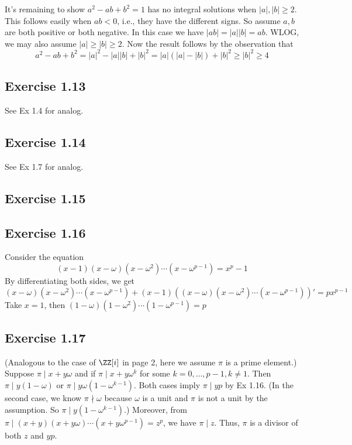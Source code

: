 \documentclass[../Chapter.tex]{subfiles}
\begin{document}
It's remaining to show $a^2-ab+b^2=1$ has no integral solutions when $|a|,|b|\geq 2$. This follows easily when $ab<0$, i.e., they have the different signs. So assume $a,b$ are both positive or both negative. In this case we have $|ab|=|a||b|=ab$. WLOG, we may also assume $|a|\geq |b|\geq 2$. Now the result follows by the observation that $$a^2-ab+b^2=|a|^2-|a||b|+|b|^2=|a|(|a|-|b|)+|b|^2\geq |b|^2\geq 4$$

\subsection*{Exercise 1.13}

See Ex 1.4 for analog.

\subsection*{Exercise 1.14}

See Ex 1.7 for analog.

\subsection*{Exercise 1.15}

\subsection*{Exercise 1.16}

Consider the equation $$(x-1)(x-\omega)(x-\omega^2)\cdots(x-\omega^{p-1})=x^p-1$$ By differentiating both sides, we get $$(x-\omega)(x-\omega^2)\cdots(x-\omega^{p-1})+(x-1)\left ( (x-\omega)(x-\omega^2)\cdots(x-\omega^{p-1}) \right )'=px^{p-1}$$
Take $x=1$, then $(1-\omega)(1-\omega^2)\cdots(1-\omega^{p-1})=p$

\subsection*{Exercise 1.17}

(Analogous to the case of $\ZZ[i]$ in page 2, here we assume $\pi$ is a prime element.) Suppose $\pi\mid x+y\omega$ and if $\pi\mid x+y\omega^k$ for some $k=0,\ldots,p-1,k\neq 1$. Then $\pi\mid y(1-\omega)$ or $\pi\mid y\omega(1-\omega^{k-1})$. Both cases imply $\pi\mid yp$ by Ex 1.16. (In the second case, we know $\pi\nmid \omega$ because $\omega$ is a unit and $\pi$ is not a unit by the assumption. So $\pi\mid y(1-\omega^{k-1})$.) Moreover, from $\pi\mid (x+y)(x+y\omega)\cdots(x+y\omega^{p-1})=z^p$, we have $\pi\mid z$. Thus, $\pi$ is a divisor of both $z$ and $yp$.
\end{document}
